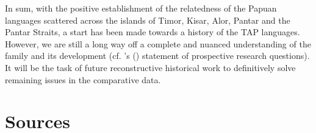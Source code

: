  

In sum, with the positive establishment of the relatedness of the Papuan languages scattered across the islands of Timor, Kisar, Alor, Pantar and the Pantar Straits, a start has been made towards a history of the TAP languages. However, we are still a long way off a complete and nuanced understanding of the family and its development (cf. \citeauthor{SchapperEtAl2012}'s (\citeyear{SchapperEtAl2012}) statement of prospective research questions). It will be the task of future reconstructive historical work to definitively solve remaining issues in the comparative data. 


\section*{Sources}

